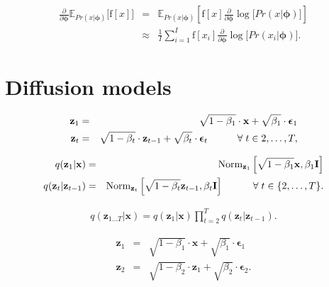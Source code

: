 \documentclass[letterpaper,twoside,openany, titlepage,oldfontcommands,titles,dvipsnames]{memoir}
\begin{document}
\begin{eqnarray}
 \frac{\partial}{\partial \boldsymbol\phi} \mathbb{E}_{Pr(x|\boldsymbol\phi)}\bigl[\mbox{f}[x]\bigr] &=& \mathbb{E}_{Pr(x|\boldsymbol\phi)}\left[\mbox{f}[x]\frac{\partial}{\partial \boldsymbol\phi} \log\bigl[ Pr(x|\boldsymbol\phi)\bigr]\right]\nonumber \\
 &\approx & \frac{1}{I}\sum_{i=1}^{I}\mbox{f}[x_i]\frac{\partial}{\partial \boldsymbol\phi} \log\bigl[ Pr(x_i|\boldsymbol\phi)\bigr].
 \end{eqnarray}

\chapter{Diffusion models}

\begin{eqnarray}\label{eq:diffusion_process}
  \mathbf{z}_{1} &=& \sqrt{1-\beta_{1}}\cdot \mathbf{x} + \sqrt{\beta_{1}}\cdot \boldsymbol\epsilon_{1} \\
  \mathbf{z}_{t} &=& \sqrt{1-\beta_{t}}\cdot \mathbf{z}_{t-1} + \sqrt{\beta_{t}}\cdot \boldsymbol\epsilon_{t} \quad\quad\quad \forall\hspace{1mm} t \in2,\ldots, T,\nonumber
 \end{eqnarray}

\begin{eqnarray}\label{eq:diffusion_process_prob}
 q(\mathbf{z}_{1}|\mathbf{x}) &=& \mbox{Norm}_{\mathbf{z}_{1}}\left[\sqrt{1-\beta_{1}}\mathbf{x},\beta_{1}\mathbf{I}\right]\\
 q(\mathbf{z}_{t}|\mathbf{z}_{t-1}) &=& \mbox{Norm}_{\mathbf{z}_{t}}\left[\sqrt{1-\beta_{t}}\mathbf{z}_{t-1},\beta_{t}\mathbf{I}\right] \quad\quad\quad \forall \hspace{1mm} t \in\{2, \ldots, T\}.\nonumber 
 \end{eqnarray}

\begin{eqnarray}\label{eq:diffusion_joint_forward}
 q(\mathbf{z}_{1\ldots T}|\mathbf{x}) =q(\mathbf{z}_{1}|\mathbf{x}) \prod_{t=2}^{T}q(\mathbf{z}_{t}|\mathbf{z}_{t-1}).
 \end{eqnarray}

\begin{eqnarray}
 \mathbf{z}_{1} &=& \sqrt{1-\beta_{1}}\cdot\mathbf{x} + \sqrt{\beta_{1}}\cdot\boldsymbol\epsilon_{1}\nonumber \\
 \mathbf{z}_{2} &=& \sqrt{1-\beta_{2}}\cdot\mathbf{z}_{1} + \sqrt{\beta_{2}}\cdot\boldsymbol\epsilon_{2}.
 \end{eqnarray}
\end{document}
